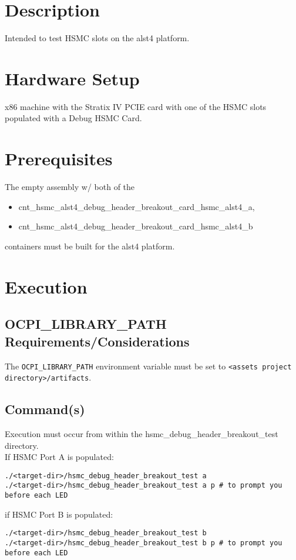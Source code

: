 \tableofcontents
\newpage

\section{Description}
Intended to test HSMC slots on the alst4 platform.
\section{Hardware Setup}
x86 machine with the Stratix IV PCIE card with one of the HSMC slots populated with a Debug HSMC Card\cite{debugcard}.
\section{Prerequisites}
The empty assembly w/ both of the
\begin{itemize}
  \item cnt\_hsmc\_alst4\_debug\_header\_breakout\_card\_hsmc\_alst4\_a,
  \item cnt\_hsmc\_alst4\_debug\_header\_breakout\_card\_hsmc\_alst4\_b
\end{itemize}
containers must be built for the alst4 platform.
\section{Execution}
\subsection{OCPI\_LIBRARY\_PATH Requirements/Considerations}
The \verb+OCPI_LIBRARY_PATH+ environment variable must be set to \verb+<assets project directory>/artifacts+.
\subsection{Command(s)}
Execution must occur from within the hsmc\_debug\_header\_breakout\_test directory. \\
If HSMC Port A is populated:
\begin{lstlisting}
./<target-dir>/hsmc_debug_header_breakout_test a
./<target-dir>/hsmc_debug_header_breakout_test a p # to prompt you before each LED
\end{lstlisting}
if HSMC Port B is populated:
\begin{lstlisting}
./<target-dir>/hsmc_debug_header_breakout_test b
./<target-dir>/hsmc_debug_header_breakout_test b p # to prompt you before each LED
\end{lstlisting}
